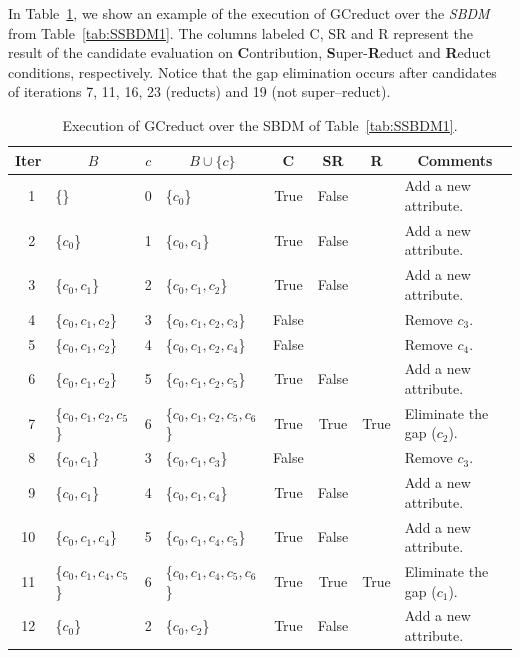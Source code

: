 \documentclass[authoryear,preprint,review,12pt]{elsarticle}
\begin{document}
	In Table~\ref{tab:sample_GCreduct}, we show an example of the execution of GCreduct over the \textit{SBDM} from Table~\ref{tab:SSBDM1}.
	The columns labeled C, SR and R represent the result of the candidate evaluation on
	\textbf{C}ontribution, \textbf{S}uper-\textbf{R}educt and \textbf{R}educt conditions, respectively. Notice that
	the gap elimination occurs after candidates of iterations 7, 11, 16, 23 (reducts) and 19 (not super--reduct).
	
	\begin{table}[!htb]
		\caption{Execution of GCreduct over the SBDM of Table~\ref{tab:SSBDM1}.}\label{tab:sample_GCreduct}
      	\centering \scriptsize
    		\begin{tabular}{|c|l|c|l|c|c|c|l|}
    		\hline
    		Iter & \multicolumn{1}{c|}{$B$} & $c$ & \multicolumn{1}{c|}{$B\cup \lbrace c\rbrace$} 
    		& C & SR & R & \multicolumn{1}{c|}{Comments}\\
    		\hline
    		~1 & \{\} 					& 0 & \{$c_0$\} 					& True & False &   & Add a new attribute.\\
    		~2 & \{$c_0$\} 				& 1 & \{$c_0,c_1$\}				& True & False &   & Add a new attribute.\\
    		~3 & \{$c_0,c_1$\} 			& 2 & \{$c_0,c_1,c_2$\}			& True & False &   & Add a new attribute.\\
    		~4 & \{$c_0,c_1,c_2$\} 		& 3 & \{$c_0,c_1,c_2,c_3$\}		& False &   &   & Remove $c_3$.\\
    		~5 & \{$c_0,c_1,c_2$\} 		& 4 & \{$c_0,c_1,c_2,c_4$\}		& False &   &   & Remove $c_4$.\\
    		~6 & \{$c_0,c_1,c_2$\}		& 5 & \{$c_0,c_1,c_2,c_5$\}		& True & False &   & Add a new attribute.\\
    		~7 & \{$c_0,c_1,c_2,c_5$\}	& 6 & \{$c_0,c_1,c_2,c_5,c_6$\} 	& True & True & True & Eliminate the gap ($c_2$).\\
    		~8 & \{$c_0,c_1$\} 			& 3 & \{$c_0,c_1,c_3$\}			& False &   &   & Remove $c_3$.\\
    		~9 & \{$c_0,c_1$\}			& 4 & \{$c_0,c_1,c_4$\}			& True & False &   & Add a new attribute.\\
    		10 & \{$c_0,c_1,c_4$\}		& 5 & \{$c_0,c_1,c_4,c_5$\}		& True & False &   & Add a new attribute.\\
    		11 & \{$c_0,c_1,c_4,c_5$\}	& 6 & \{$c_0,c_1,c_4,c_5,c_6$\} 	& True & True & True & Eliminate the gap ($c_1$).\\
    		12 & \{$c_0$\} 				& 2 & \{$c_0,c_2$\}				& True & False &   & Add a new attribute.\\

\end{tabular}
\end{table}
\end{document}
